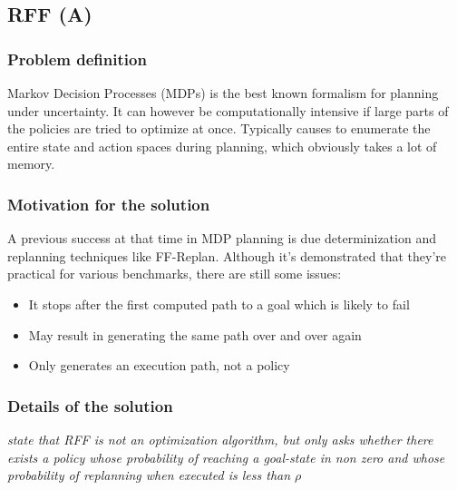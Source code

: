 \documentclass[runningheads,a4paper]{llncs}
\begin{document}
\subsection{RFF (A)}

\subsubsection{Problem definition}

Markov Decision Processes (MDPs) is the best known formalism for planning under
uncertainty. It can however be computationally intensive if large parts of the
policies are tried to optimize at once. Typically causes to enumerate the
entire state and action spaces during planning, which obviously takes a lot of
memory.

\subsubsection{Motivation for the solution}

A previous success at that time in MDP planning is due determinization and
replanning techniques like FF-Replan. Although it's demonstrated that they're
practical for various benchmarks, there are still some issues:

\begin{itemize}
	\item It stops after the first computed path to a goal which is likely to fail
	\item May result in generating the same path over and over again
	\item Only generates an execution path, not a policy
\end{itemize}



\subsubsection{Details of the solution}

\emph{state that RFF is not an optimization algorithm, but only asks whether
there exists a policy whose probability of reaching a goal-state in non zero
and whose probability of replanning when executed is less than $\rho$}
\end{document}
